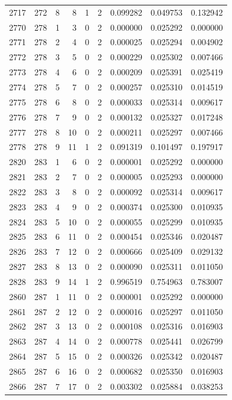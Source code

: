 \begin{longtable}{rrrrrrrrr}
2717 & 272 & 8 & 8 & 1 & 2 & 0.099282 & 0.049753 & 0.132942 \\
2770 & 278 & 1 & 3 & 0 & 2 & 0.000000 & 0.025292 & 0.000000 \\
2771 & 278 & 2 & 4 & 0 & 2 & 0.000025 & 0.025294 & 0.004902 \\
2772 & 278 & 3 & 5 & 0 & 2 & 0.000229 & 0.025302 & 0.007466 \\
2773 & 278 & 4 & 6 & 0 & 2 & 0.000209 & 0.025391 & 0.025419 \\
2774 & 278 & 5 & 7 & 0 & 2 & 0.000257 & 0.025310 & 0.014519 \\
2775 & 278 & 6 & 8 & 0 & 2 & 0.000033 & 0.025314 & 0.009617 \\
2776 & 278 & 7 & 9 & 0 & 2 & 0.000132 & 0.025327 & 0.017248 \\
2777 & 278 & 8 & 10 & 0 & 2 & 0.000211 & 0.025297 & 0.007466 \\
2778 & 278 & 9 & 11 & 1 & 2 & 0.091319 & 0.101497 & 0.197917 \\
2820 & 283 & 1 & 6 & 0 & 2 & 0.000001 & 0.025292 & 0.000000 \\
2821 & 283 & 2 & 7 & 0 & 2 & 0.000005 & 0.025293 & 0.000000 \\
2822 & 283 & 3 & 8 & 0 & 2 & 0.000092 & 0.025314 & 0.009617 \\
2823 & 283 & 4 & 9 & 0 & 2 & 0.000374 & 0.025300 & 0.010935 \\
2824 & 283 & 5 & 10 & 0 & 2 & 0.000055 & 0.025299 & 0.010935 \\
2825 & 283 & 6 & 11 & 0 & 2 & 0.000454 & 0.025346 & 0.020487 \\
2826 & 283 & 7 & 12 & 0 & 2 & 0.000666 & 0.025409 & 0.029132 \\
2827 & 283 & 8 & 13 & 0 & 2 & 0.000090 & 0.025311 & 0.011050 \\
2828 & 283 & 9 & 14 & 1 & 2 & 0.996519 & 0.754963 & 0.783007 \\
2860 & 287 & 1 & 11 & 0 & 2 & 0.000001 & 0.025292 & 0.000000 \\
2861 & 287 & 2 & 12 & 0 & 2 & 0.000016 & 0.025297 & 0.011050 \\
2862 & 287 & 3 & 13 & 0 & 2 & 0.000108 & 0.025316 & 0.016903 \\
2863 & 287 & 4 & 14 & 0 & 2 & 0.000778 & 0.025441 & 0.026799 \\
2864 & 287 & 5 & 15 & 0 & 2 & 0.000326 & 0.025342 & 0.020487 \\
2865 & 287 & 6 & 16 & 0 & 2 & 0.000682 & 0.025350 & 0.016903 \\
2866 & 287 & 7 & 17 & 0 & 2 & 0.003302 & 0.025884 & 0.038253 \\

\end{longtable}
